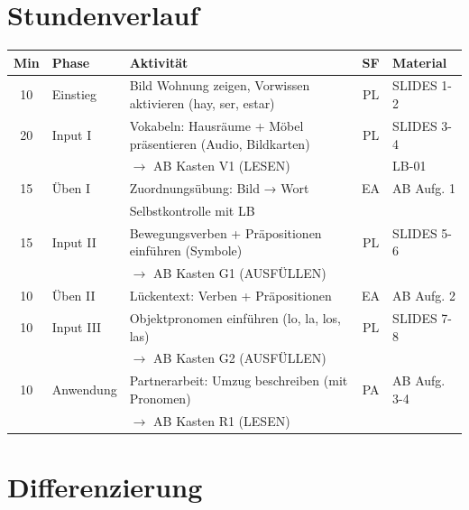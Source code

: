 \documentclass[11pt, a4paper]{article}
\begin{document}

\section*{Stundenverlauf}

\begin{tabularx}{\textwidth}{@{}c|l|X|c|l@{}}
\textbf{Min} & \textbf{Phase} & \textbf{Aktivität} & \textbf{SF} & \textbf{Material} \\
\midrule
10 & Einstieg & Bild Wohnung zeigen, Vorwissen aktivieren (hay, ser, estar) & PL & SLIDES 1-2 \\
\midrule
20 & Input I & Vokabeln: Hausräume + Möbel präsentieren (Audio, Bildkarten) & PL & SLIDES 3-4 \\
& & $\rightarrow$ AB Kasten V1 (LESEN) & & LB-01 \\
\midrule
15 & Üben I & Zuordnungsübung: Bild → Wort & EA & AB Aufg. 1 \\
& & Selbstkontrolle mit LB & & \\
\midrule
15 & Input II & Bewegungsverben + Präpositionen einführen (Symbole) & PL & SLIDES 5-6 \\
& & $\rightarrow$ AB Kasten G1 (AUSFÜLLEN) & & \\
\midrule
10 & Üben II & Lückentext: Verben + Präpositionen & EA & AB Aufg. 2 \\
\midrule
10 & Input III & Objektpronomen einführen (lo, la, los, las) & PL & SLIDES 7-8 \\
& & $\rightarrow$ AB Kasten G2 (AUSFÜLLEN) & & \\
\midrule
10 & Anwendung & Partnerarbeit: Umzug beschreiben (mit Pronomen) & PA & AB Aufg. 3-4 \\
\midrule
& & $\rightarrow$ AB Kasten R1 (LESEN) & & \\
\bottomrule
\end{tabularx}


\section*{Differenzierung}
\end{document}
